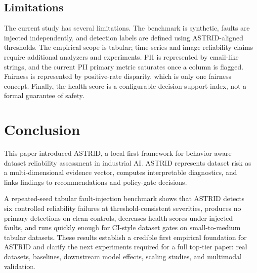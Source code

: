 \documentclass[runningheads]{llncs}
\begin{document}
\subsection{Limitations}
\label{sec:limits}

The current study has several limitations. The benchmark is synthetic, faults are
injected independently, and detection labels are defined using ASTRID-aligned
thresholds. The empirical scope is tabular; time-series and image reliability
claims require additional analyzers and experiments. PII is represented by
email-like strings, and the current PII primary metric saturates once a column is
flagged. Fairness is represented by positive-rate disparity, which is only one
fairness concept. Finally, the health score is a configurable decision-support
index, not a formal guarantee of safety.

\section{Conclusion}

This paper introduced ASTRID, a local-first framework for behavior-aware dataset
reliability assessment in industrial AI. ASTRID represents dataset risk as a
multi-dimensional evidence vector, computes interpretable diagnostics, and links
findings to recommendations and policy-gate decisions.

A repeated-seed tabular fault-injection benchmark shows that ASTRID detects six
controlled reliability failures at threshold-consistent severities, produces no
primary detections on clean controls, decreases health scores under injected
faults, and runs quickly enough for CI-style dataset gates on small-to-medium
tabular datasets. These results establish a credible first empirical foundation
for ASTRID and clarify the next experiments required for a full top-tier paper:
real datasets, baselines, downstream model effects, scaling studies, and
multimodal validation.
\end{document}
